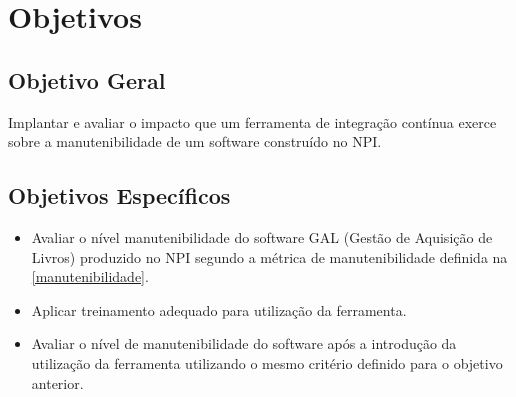 \chapter{Objetivos}\label{objetivos}
\section{Objetivo Geral}\label{objetivoger}
Implantar e avaliar o impacto que um ferramenta de integração contínua exerce sobre a manutenibilidade de um software construído no NPI.

\section{Objetivos Específicos}

\begin{itemize}
\item Avaliar o nível manutenibilidade do software GAL (Gestão de Aquisição de Livros) produzido no NPI segundo a métrica de manutenibilidade definida na \autoref{manutenibilidade}.
\item Aplicar treinamento adequado para utilização da ferramenta.
\item Avaliar o nível de manutenibilidade do software após a introdução da utilização da ferramenta utilizando o mesmo critério definido para o objetivo anterior.
\end{itemize}